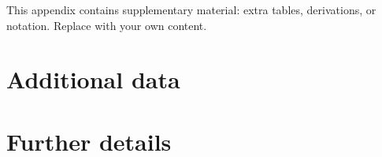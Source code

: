 %

This appendix contains supplementary material: extra tables, derivations, or notation. Replace with your own content.

\section{Additional data}\label{app:data}

\lipsum[53-54]

\section{Further details}\label{app:details}

\lipsum[55-56]
